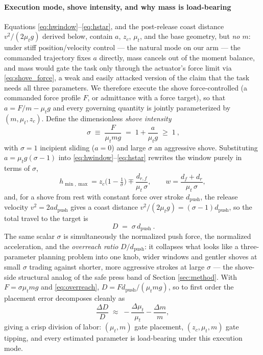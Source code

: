 \documentclass[10pt, conference]{IEEEtran}
\begin{document}
\paragraph{Execution mode, shove intensity, and why mass is load-bearing} \label{sec:shove_control}
Equations \eqref{eq:hwindow}--\eqref{eq:hstar}, and the post-release coast distance $v^2/(2\mu_t g)$ derived below, contain $a$, $z_c$, $\mu_t$, and the base geometry, but \emph{no $m$}: under stiff position/velocity control --- the natural mode on our arm --- the commanded trajectory fixes $a$ directly, mass cancels out of the moment balance, and mass would gate the task only through the actuator's force limit via \eqref{eq:shove_force}, a weak and easily attacked version of the claim that the task needs all three parameters. We therefore execute the shove force-controlled (a commanded force profile $F$, or admittance with a force target), so that $a = F/m - \mu_t g$ and every governing quantity is jointly parameterized by $(m,\mu_t,z_c)$. Define the dimensionless \emph{shove intensity}
\begin{equation}
    \boxed{\ \sigma \;\equiv\; \frac{F}{\mu_t m g} \;=\; 1 + \frac{a}{\mu_t g} \;\ge\; 1\ }, \label{eq:sigma}
\end{equation}
with $\sigma=1$ incipient sliding ($a=0$) and large $\sigma$ an aggressive shove. Substituting $a = \mu_t g(\sigma-1)$ into \eqref{eq:hwindow}--\eqref{eq:hstar} rewrites the window purely in terms of $\sigma$,
\begin{equation}
    h_{\min,\max} = z_c\Big(1-\tfrac{1}{\sigma}\Big) \mp \frac{d_{r,f}}{\mu_t\,\sigma}, \qquad
    w = \frac{d_f+d_r}{\mu_t\,\sigma}, \label{eq:sigma_window}
\end{equation}
and, for a shove from rest with constant force over stroke $d_{\mathrm{push}}$, the release velocity $v^2 = 2ad_{\mathrm{push}}$ gives a coast distance $v^2/(2\mu_t g) = (\sigma-1)d_{\mathrm{push}}$, so the total travel to the target is
\begin{equation}
    \boxed{\ D \;=\; \sigma\, d_{\mathrm{push}}\ }. \label{eq:overreach}
\end{equation}
The same scalar $\sigma$ is simultaneously the normalized push force, the normalized acceleration, and the \emph{overreach ratio} $D/d_{\mathrm{push}}$: it collapses what looks like a three-parameter planning problem into one knob, wider windows and gentler shoves at small $\sigma$ trading against shorter, more aggressive strokes at large $\sigma$ --- the shove-side structural analog of the safe press band of Section \ref{sec:method}. With $F = \sigma \mu_t m g$ and \eqref{eq:overreach}, $D = F d_{\mathrm{push}}/(\mu_t m g)$, so to first order the placement error decomposes cleanly as
\begin{equation}
    \frac{\Delta D}{D} \;\approx\; -\frac{\Delta\mu_t}{\mu_t} - \frac{\Delta m}{m}, \label{eq:placement_error}
\end{equation}
giving a crisp division of labor: $(\mu_t,m)$ gate placement, $(z_c,\mu_t,m)$ gate tipping, and every estimated parameter is load-bearing under this execution mode.
\end{document}
